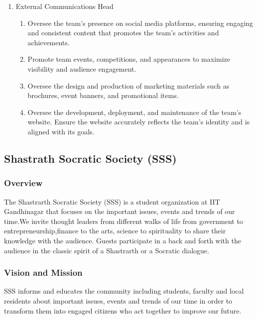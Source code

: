 \documentclass[12pt]{article}
\begin{document}
\begin{enumerate}
\begin{enumerate}
        \item Ensure all contractual sponsorship obligations are fulfilled, including branding, promotions, and hospitality.
        \item Reaching out to alumni for gathering funds for the SAE chapter IITGN.
    \end{enumerate}
    \item External Communications Head
    \begin{enumerate}
        \item Oversee the team’s presence on social media platforms, ensuring engaging and consistent content that promotes the team’s activities and achievements.
        \item Promote team events, competitions, and appearances to maximize visibility and audience engagement.
        \item Oversee the design and production of marketing materials such as brochures, event banners, and promotional items.
        \item Oversee the development, deployment, and maintenance of the team's website. Ensure the website accurately reflects the team's identity and is aligned with its goals.
    \end{enumerate}
\end{enumerate}

\subsection{Shastrath Socratic Society (SSS)}
\subsubsection{Overview}
The Shastrarth Socratic Society (SSS) is a student organization at IIT Gandhinagar that focuses on the important issues, events and trends of our time.We invite thought leaders from different walks of life from government to entrepreneurship,finance to the arts, science to spirituality to share their knowledge with the audience. Guests participate in a back and forth with the audience in the classic spirit of a Shastrarth or a Socratic dialogue.

\subsubsection{Vision and Mission}
SSS informs and educates the community including students, faculty and local residents about important issues, events and trends of our time in order to transform them into engaged citizens who act together to improve our future.
\end{document}
